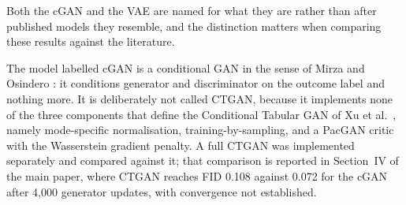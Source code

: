 \documentclass[journal,onecolumn]{IEEEtran}
\begin{document}
\begin{table}[!t]
  \centering
  \caption{Complete Architecture and Optimiser Settings for the Three Generative Models}
  \label{tab:arch}
\end{table}

Both the cGAN and the VAE are named for what they are rather than after published models they resemble, and the distinction matters when comparing these results against the literature.

The model labelled cGAN is a conditional GAN in the sense of Mirza and Osindero \cite{mirza2014}: it conditions generator and discriminator on the outcome label and nothing more. It is deliberately not called CTGAN, because it implements none of the three components that define the Conditional Tabular GAN of Xu et al.\ \cite{xu2019}, namely mode-specific normalisation, training-by-sampling, and a PacGAN critic with the Wasserstein gradient penalty. A full CTGAN was implemented separately and compared against it; that comparison is reported in Section~IV of the main paper, where CTGAN reaches FID 0.108 against 0.072 for the cGAN after 4{,}000 generator updates, with convergence not established.
\end{document}
